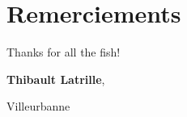 \thispagestyle{empty}
\section*{Remerciements}

Thanks for all the fish!

\begin{flushright}
	\textbf{Thibault Latrille},
	
	Villeurbanne
\end{flushright}
